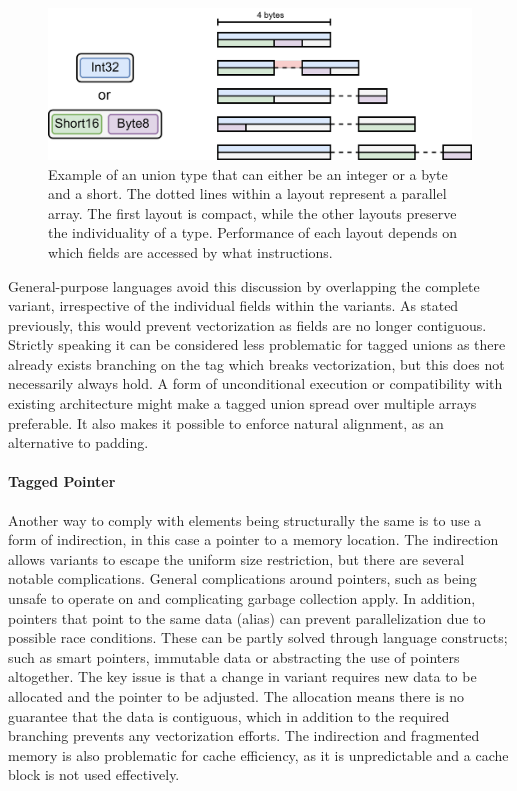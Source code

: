 \documentclass{article}
\begin{document}
\begin{figure}[ht]
    \centering
    \includegraphics[scale=0.1]{TaggedUnion.png}
    \caption
    { 
        Example of an union type that can either be an integer or a byte and a short.
        The dotted lines within a layout represent a parallel array.
        The first layout is compact, while the other layouts preserve the individuality of a type.
        Performance of each layout depends on which fields are accessed by what instructions.
    }
\end{figure}

General-purpose languages avoid this discussion by overlapping the complete variant, irrespective of the individual fields within the variants.
As stated previously, this would prevent vectorization as fields are no longer contiguous. 
Strictly speaking it can be considered less problematic for tagged unions as there already exists branching on the tag which breaks vectorization, but this does not necessarily always hold.
A form of unconditional execution or compatibility with existing architecture might make a tagged union spread over multiple arrays preferable.
It also makes it possible to enforce natural alignment, as an alternative to padding.

\paragraph{Tagged Pointer}

Another way to comply with elements being structurally the same is to use a form of indirection, in this case a pointer to a memory location.
The indirection allows variants to escape the uniform size restriction, but there are several notable complications.
General complications around pointers, such as being unsafe to operate on and complicating garbage collection apply.
In addition, pointers that point to the same data (alias) can prevent parallelization due to possible race conditions.
These can be partly solved through language constructs; such as smart pointers, immutable data or abstracting the use of pointers altogether.
The key issue is that a change in variant requires new data to be allocated and the pointer to be adjusted.
The allocation means there is no guarantee that the data is contiguous, which in addition to the required branching prevents any vectorization efforts.
The indirection and fragmented memory is also problematic for cache efficiency, as it is unpredictable and a cache block is not used effectively.
\end{document}
